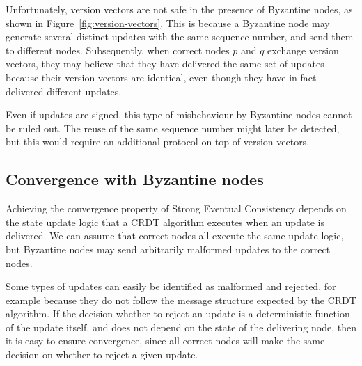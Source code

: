 \documentclass[sigplan,review]{acmart}
\begin{document}
Unfortunately, version vectors are not safe in the presence of Byzantine nodes, as shown in Figure~\ref{fig:version-vectors}.
This is because a Byzantine node may generate several distinct updates with the same sequence number, and send them to different nodes.
Subsequently, when correct nodes $p$ and $q$ exchange version vectors, they may believe that they have delivered the same set of updates because their version vectors are identical, even though they have in fact delivered different updates.

Even if updates are signed, this type of misbehaviour by Byzantine nodes cannot be ruled out.
The reuse of the same sequence number might later be detected, but this would require an additional protocol on top of version vectors.

\subsection{Convergence with Byzantine nodes}\label{sec:convergence}

Achieving the convergence property of Strong Eventual Consistency depends on the state update logic that a CRDT algorithm executes when an update is delivered.
We can assume that correct nodes all execute the same update logic, but Byzantine nodes may send arbitrarily malformed updates to the correct nodes.

Some types of updates can easily be identified as malformed and rejected, for example because they do not follow the message structure expected by the CRDT algorithm.
If the decision whether to reject an update is a deterministic function of the update itself, and does not depend on the state of the delivering node, then it is easy to ensure convergence, since all correct nodes will make the same decision on whether to reject a given update.
\end{document}
